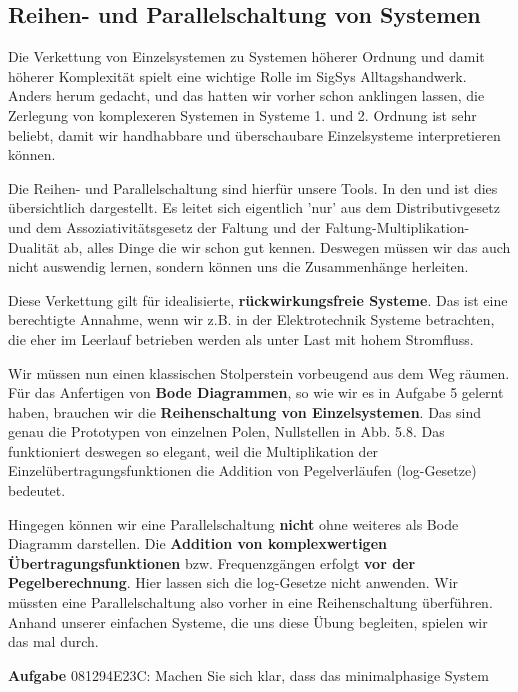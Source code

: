 \subsection{Reihen- und Parallelschaltung von Systemen}
\label{sec:081294E23C}
\begin{Ziel}
Die Verkettung von Einzelsystemen zu Systemen höherer Ordnung und damit
höherer Komplexität spielt eine wichtige Rolle im SigSys Alltagshandwerk.
Anders herum gedacht, und das hatten wir vorher schon anklingen lassen, die
Zerlegung von komplexeren Systemen in Systeme 1. und 2. Ordnung ist
sehr beliebt, damit wir handhabbare und überschaubare Einzelsysteme interpretieren
können.

Die Reihen- und Parallelschaltung
sind hierfür unsere Tools.
In den  und 
ist dies übersichtlich dargestellt. Es leitet sich eigentlich 'nur' aus dem
Distributivgesetz und dem Assoziativitätsgesetz der Faltung und der
Faltung-Multiplikation-Dualität ab, alles Dinge die wir schon gut kennen.
Deswegen müssen wir das auch nicht auswendig lernen, sondern können uns
die Zusammenhänge herleiten.

Diese Verkettung gilt für idealisierte, \textbf{rückwirkungsfreie Systeme}.
Das ist eine berechtigte Annahme, wenn wir z.B. in der Elektrotechnik Systeme
betrachten, die eher im Leerlauf betrieben werden als unter Last mit hohem Stromfluss.


Wir müssen nun einen klassischen Stolperstein vorbeugend aus dem Weg räumen.
Für das Anfertigen von \textbf{Bode Diagrammen}, so wie wir es in Aufgabe 5 gelernt haben,
brauchen wir die \textbf{Reihenschaltung von Einzelsystemen}. Das sind
genau die Prototypen von einzelnen Polen, Nullstellen in Abb. 5.8.
Das funktioniert deswegen so elegant, weil die Multiplikation der
Einzelübertragungsfunktionen die Addition von Pegelverläufen (log-Gesetze)
bedeutet.

Hingegen können wir eine Parallelschaltung \textbf{nicht} ohne weiteres
als Bode Diagramm darstellen.
Die \textbf{Addition von komplexwertigen Übertragungsfunktionen} bzw. Frequenzgängen
erfolgt \textbf{vor der Pegelberechnung}. Hier lassen sich die log-Gesetze nicht anwenden.
Wir müssten eine Parallelschaltung also vorher in eine Reihenschaltung überführen.
%
Anhand unserer einfachen Systeme, die uns diese Übung begleiten, spielen wir das
mal durch.

\end{Ziel}
\textbf{Aufgabe} {\tiny 081294E23C}: Machen Sie sich klar, dass das minimalphasige System
